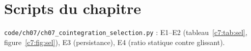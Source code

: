 \section{Scripts du chapitre}
\noindent\texttt{code/ch07/ch07\_cointegration\_selection.py} : E1–E2 (tableau~\ref{c7:tab:sel}, figure~\ref{c7:fig:sel}), E3 (persistance), E4 (ratio statique contre glissant).
